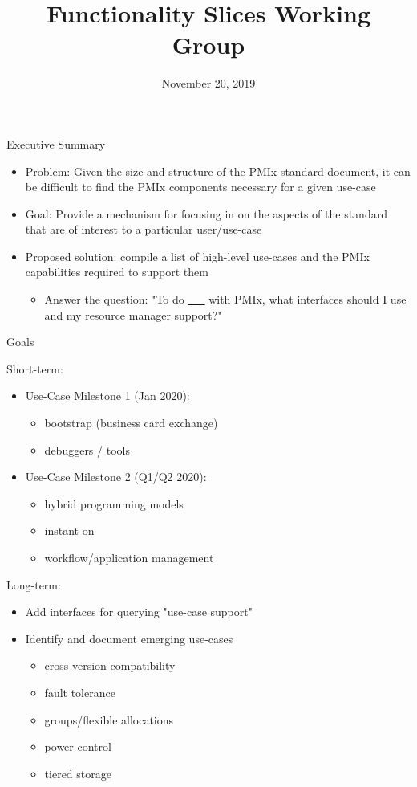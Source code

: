\documentclass[presentation]{beamer}
\date{November 20, 2019}
\title{Functionality Slices Working Group}
\begin{document}
\maketitle

\begin{frame}[label={sec:org367b03c}]{Executive Summary}
\begin{itemize}
\item \alert{Problem:} Given the size and structure of the PMIx standard document, it can be difficult to find the PMIx components necessary for a given use-case
\item \alert{Goal:} Provide a mechanism for focusing in on the aspects of the standard that are of interest to a particular user/use-case
\item \alert{Proposed solution:} compile a list of high-level use-cases and the PMIx capabilities required to support them
\begin{itemize}
\item Answer the question: "To do \uline{\_\_} with PMIx, what interfaces should I use and my resource manager support?"
\end{itemize}
\end{itemize}
\end{frame}
\begin{frame}[label={sec:org614605e}]{Goals}
\begin{block}{Short-term:}
\begin{itemize}
\item Use-Case Milestone 1 (Jan 2020):
\begin{itemize}
\item bootstrap (business card exchange)
\item debuggers / tools
\end{itemize}
\item Use-Case Milestone 2 (Q1/Q2 2020):
\begin{itemize}
\item hybrid programming models
\item instant-on
\item workflow/application management
\end{itemize}
\end{itemize}
\end{block}
\begin{block}{Long-term:}
\begin{itemize}
\item Add interfaces for querying "use-case support"
\item Identify and document emerging use-cases
\begin{itemize}
\item cross-version compatibility
\item fault tolerance
\item groups/flexible allocations
\item power control
\item tiered storage
\end{itemize}
\end{itemize}
\end{block}
\end{frame}
\end{document}
